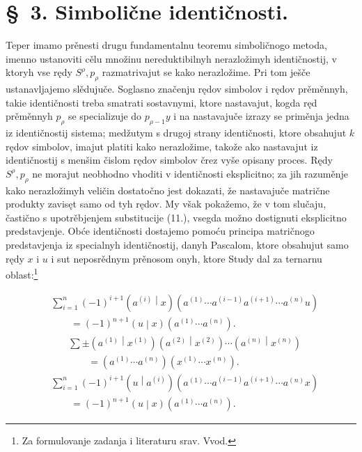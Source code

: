\documentclass[11pt]{article}
\newcommand{\pair}[2]{\left(#1\middle|#2\right)}
\begin{document}
\section*{\S\ 3. Simbolične identičnosti.}

Teper imamo prěnesti drugu fundamentalnu teoremu simboličnogo metoda, imenno ustanoviti cělu množinu nereduktibilnyh nerazložimyh identičnostij, v ktoryh vse rędy $S^\rho,p_\rho$ razmatrivajut se kako nerazložime. Pri tom ješče ustanavljajemo slědujuče. Soglasno značenju rędov simbolov i rędov prěměnnyh, takie identičnosti treba smatrati sostavnymi, ktore nastavajut, kogda ręd prěměnnyh $p_\rho$ se specializuje do $p_{\rho-1}y$ i na nastavajuče izrazy se priměnja jedna iz identičnostij sistema; medžutym s drugoj strany identičnosti, ktore obsahujut $k$ rędov simbolov, imajut platiti kako nerazložime, takože ako nastavajut iz identičnostij s menšim čislom rędov simbolov črez vyše opisany proces. Rędy $S^\rho,p_\rho$ ne morajut neobhodno vhoditi v identičnosti eksplicitno; za jih razuměnje kako nerazložimyh veličin dostatočno jest dokazati, že nastavajuče matrične produkty zavisęt samo od tyh rędov. My však pokažemo, že v tom slučaju, častično s upotrěbjenjem substitucije (11.), vsegda možno dostignuti eksplicitno predstavjenje. Obće identičnosti dostajemo pomoću principa matričnogo predstavjenja iz specialnyh identičnostij, danyh Pascalom, ktore obsahujut samo rędy $x$ i $u$ i sut neposrědnym prěnosom onyh, ktore Study dal za ternarnu oblast:\footnote{Za formulovanje zadanja i literaturu srav. Vvod.}

\begin{equation}
\begin{aligned}
&\sum_{i=1}^n(-1)^{i+1}\pair{a^{(i)}}{x}
(a^{(1)}\cdots a^{(i-1)}a^{(i+1)}\cdots a^{(n)}u)\\
&\qquad =(-1)^{n+1}\pair{u}{x}(a^{(1)}\cdots a^{(n)}).
\end{aligned}
\tag{13}
\end{equation}
\begin{equation}
\begin{aligned}
&\sum\pm\pair{a^{(1)}}{x^{(1)}}\pair{a^{(2)}}{x^{(2)}}\cdots
\pair{a^{(n)}}{x^{(n)}}\\
&\qquad=(a^{(1)}\cdots a^{(n)})(x^{(1)}\cdots x^{(n)}).
\end{aligned}
\tag{14}
\end{equation}
\begin{equation}
\begin{aligned}
&\sum_{i=1}^n(-1)^{i+1}\pair{u}{a^{(i)}}
(a^{(1)}\cdots a^{(i-1)}a^{(i+1)}\cdots a^{(n)}x)\\
&\qquad =(-1)^{n+1}\pair{u}{x}(a^{(1)}\cdots a^{(n)}).
\end{aligned}
\tag{15}
\end{equation}
\end{document}
